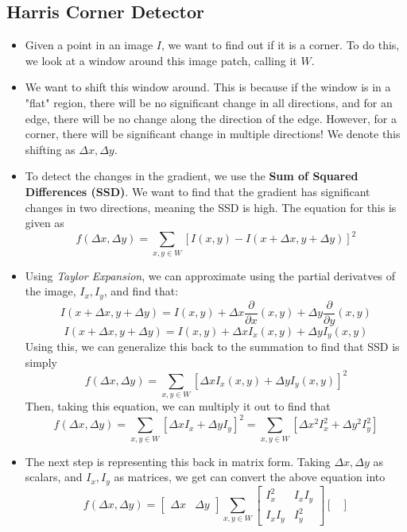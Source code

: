 \documentclass{article}
\begin{document}
\subsection{Harris Corner Detector}
\begin{itemize}
    \item Given a point in an image $I$, we want to find out if it is a corner. To do this, we look at a window around this image patch, calling it $W$. 
    \item We want to shift this window around. This is because if the window is in a "flat" region, there will be no significant change in all directions, and for an edge, there will be no change along the direction of the edge. However, for a corner, there will be significant change in multiple directions! We denote this shifting as $\Delta x, \Delta y$.
    \item To detect the changes in the gradient, we use the \textbf{Sum of Squared Differences (SSD)}. We want to find that the gradient has significant changes in two directions, meaning the SSD is high. The equation for this is given as 
    $$f(\Delta x, \Delta y) = \sum_{x,y\in W}[I(x,y) - I(x+\Delta x, y+ \Delta y)]^2$$
    \item Using \textit{Taylor Expansion}, we can approximate using the partial derivatves of the image, $I_x, I_y$, and find that:
    $$I(x+\Delta x, y + \Delta y) = I(x,y) + \Delta x\frac{\partial}{\partial x}(x,y) + \Delta y\frac{\partial}{\partial y}(x,y)$$
    $$I(x+\Delta x, y + \Delta y) = I(x,y) + \Delta xI_x(x,y) + \Delta yI_y(x,y)$$
    Using this, we can generalize this back to the summation to find that SSD is simply
    $$f(\Delta x, \Delta y) = \sum_{x,y\in W}[\Delta xI_x(x,y) + \Delta yI_y(x,y)]^2$$
    Then, taking this equation, we can multiply it out to find that
    $$f(\Delta x, \Delta y) = \sum_{x,y\in W}[\Delta xI_x + \Delta yI_y]^2 = \sum_{x,y\in W}[\Delta x^2I_x^2 + \Delta y^2I_y^2]$$
    \item The next step is representing this back in matrix form. Taking $\Delta x, \Delta y$ as scalars, and $I_x,I_y$ as matrices, we get can convert the above equation into
    $$f(\Delta x, \Delta y) =
    \begin{bmatrix}
    \Delta x & \Delta y
    \end{bmatrix}
    \sum_{x,y \in W}
    \begin{bmatrix}
    I_x^2 & I_xI_y \\
    I_xI_y & I_y^2 
    \end{bmatrix}
    \begin{bmatrix}

\end{bmatrix}$$
\end{itemize}
\end{document}
